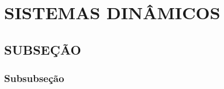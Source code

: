 \section{\textbf{SISTEMAS DINÂMICOS }}\label{c2}
\vspace{0.5cm}


\vspace{0.5cm}
\subsection{SUBSEÇÃO}
\vspace{0.5cm}


\vspace{0.5cm}
\subsubsection{Subsubseção} \label{lyapunov}
\vspace{0.5cm}

